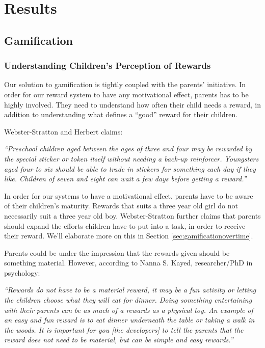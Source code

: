 \chapter{Results}
\label{chp:results}

\section{Gamification}
\label{sec:gamificationresults}

\subsection{Understanding Children's Perception of Rewards}

Our solution to gamification is tightly coupled with the parents' initiative. In order for our reward system to have any motivational effect, parents has to be highly involved. They need to understand how often their child needs a reward, in addition to understanding what defines a ``good'' reward for their children. 

Webster-Stratton and Herbert claims:

\textit{``Preschool children aged between the ages of three and four may be rewarded by the special sticker or token itself without needing a back-up reinforcer. Youngsters aged four to six should be able to trade in stickers for something each day if they like. Children of seven and eight can wait a few days before getting a reward.''}\cite{webster1994troubled}

In order for our systems to have a motivational effect, parents have to be aware of their children's maturity. Rewards that suits a three year old girl do not necessarily suit a three year old boy. Webster-Stratton further claims that parents should expand the efforts children have to put into a task, in order to receive their reward. We'll elaborate more on this in Section \ref{sec:gamificationovertime}. 

Parents could be under the impression that the rewards given should be something material. However, according to Nanna S. Kayed, researcher/PhD in psychology: 

\textit{``Rewards do not have to be a material reward, it may be a fun activity or letting the children choose what they will eat for dinner. Doing something entertaining with their parents can be as much of a rewards as a physical toy. An example of an easy and fun reward is to eat dinner underneath the table or taking a walk in the woods. It is important for you [the developers] to tell the parents that the reward does not need to be material, but can be simple and easy rewards.''}

